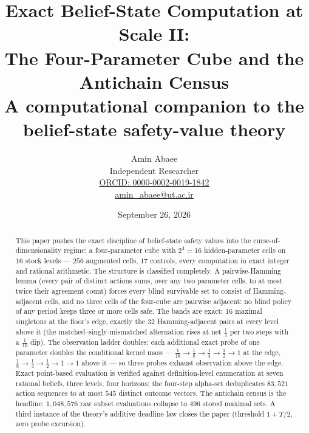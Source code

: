 \documentclass[10pt,twocolumn]{article}
\theoremstyle{plain}
\theoremstyle{definition}
\theoremstyle{remark}
\begin{document}
\title{Exact Belief-State Computation at Scale II:\\
The Four-Parameter Cube and the Antichain Census\\[0.2em]
{\large\rmfamily A computational companion to the belief-state
safety-value theory}}
\author{Amin Abaee\\[0.35em]
{\small Independent Researcher}\\[0.55em]
{\small\href{https://orcid.org/0000-0002-0019-1842}{ORCID: 0000-0002-0019-1842}}\\[0.3em]
{\small\href{mailto:amin\_abaee@ut.ac.ir}{amin\_abaee@ut.ac.ir}}}
\date{September 26, 2026}
\maketitle

\begin{abstract}
This paper pushes the exact discipline of belief-state safety values into the curse-of-dimensionality regime: a four-parameter cube with
\(2^{4} = 16\) hidden-parameter cells on \(16\) stock levels ---
\(256\) augmented cells, \(17\) controls, every computation in exact
integer and rational arithmetic. The structure is classified
completely. A pairwise-Hamming lemma (every pair of distinct actions
sums, over any two parameter cells, to at most twice their agreement
count) forces every blind survivable set to consist of
Hamming-adjacent cells, and no three cells of the four-cube are
pairwise adjacent: no blind policy of any period keeps three or more
cells safe. The bands are exact: \(16\) maximal singletons at the
floor's edge, exactly the \(32\) Hamming-adjacent pairs at every level
above it (the matched--singly-mismatched alternation rises at net
\(\tfrac15\) per two steps with a \(\tfrac1{10}\) dip). The
observation ladder doubles: each additional exact probe of one
parameter doubles the conditional kernel mass ---
\(\tfrac1{16} \to \tfrac18 \to \tfrac14 \to \tfrac12 \to 1\) at the
edge, \(\tfrac18 \to \tfrac14 \to \tfrac12 \to 1 \to 1\) above it ---
so three probes exhaust observation above the edge. Exact point-based
evaluation is verified against definition-level enumeration at seven
rational beliefs, three levels, four horizons; the four-step alpha-set
deduplicates \(83{,}521\) action sequences to at most \(545\) distinct
outcome vectors. The antichain census is the headline:
\(1{,}048{,}576\) raw subset evaluations collapse to \(496\) stored
maximal sets. A third instance of the theory's additive deadline law closes the paper (threshold \(1 + T/2\), zero probe
excursion).
\end{abstract}
\end{document}
